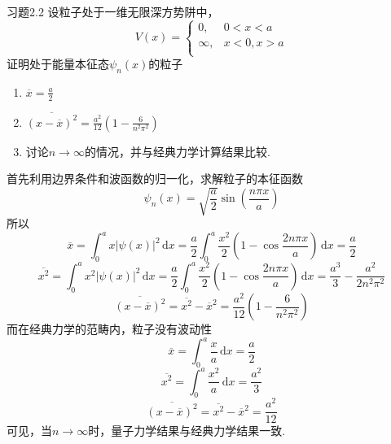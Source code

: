 \begin{question}{习题2.2}
    设粒子处于一维无限深方势阱中，
    $$
        V(x) = \begin{cases}
            0,      & 0<x<a    \\
            \infty, & x<0, x>a \\
        \end{cases}
    $$
    证明处于能量本征态$\psi_n(x)$的粒子
    \begin{enumerate}
        \item $\displaystyle \overline{x}=\frac{a}{2}$
        \item $\displaystyle \overline{\left(x-\overline{x}\right)^2} = \frac{a^2}{12}\left(1-\frac{6}{n^2\pi^2}\right)$
        \item 讨论$n\to\infty$的情况，并与经典力学计算结果比较.
    \end{enumerate}
\end{question}
\begin{solution}
    首先利用边界条件和波函数的归一化，求解粒子的本征函数
    $$
        \psi_n(x) = \sqrt{\frac{a}{2}}\sin\left(\frac{n\pi x}{a}\right)
    $$
    所以
    $$
        \overline{x} = \int_{0}^{a}x|\psi(x)|^2\,\mathrm{d}x
        = \frac{a}{2}\int_0^a\frac{x^2}{2}\left(1-\cos\frac{2n\pi x}{a}\right)\,\mathrm{d}x
        = \frac{a}{2}
    $$
    $$
        \overline{x^2}
        = \int_{0}^{a}x^2|\psi(x)|^2\,\mathrm{d}x
        = \frac{a}{2}\int_0^a\frac{x^2}{2}\left(1-\cos\frac{2n\pi x}{a}\right)\,\mathrm{d}x
        = \frac{a^3}{3} - \frac{a^2}{2n^2\pi^2}
    $$
    $$
        \overline{\left(x-\overline{x}\right)^2}
        = \overline{x^2} - \overline{x}^2
        = \frac{a^2}{12}\left(1-\frac{6}{n^2\pi^2}\right)
    $$
    而在经典力学的范畴内，粒子没有波动性
    $$
        \overline{x}
        = \int_{0}^{a}\frac{x}{a}\,\mathrm{d}x
        = \frac{a}{2}
    $$
    $$
        \overline{x^2}
        = \int_{0}^{a}\frac{x^2}{a}\,\mathrm{d}x
        = \frac{a^2}{3}
    $$
    $$
        \overline{\left(x-\overline{x}\right)^2}
        = \overline{x^2} - \overline{x}^2
        = \frac{a^2}{12}
    $$
    可见，当$n\to\infty$时，量子力学结果与经典力学结果一致.
\end{solution}

